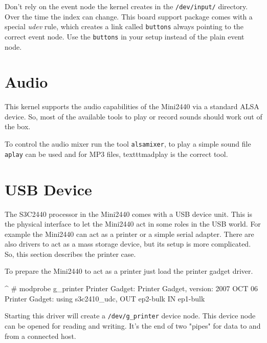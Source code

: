 \begin{important}
Don't rely on the event node the kernel creates in the \texttt{/dev/input/}
directory. Over the time the index can change. This board support package comes
with a special \textit{udev} rule, which creates a link called \texttt{buttons}
always pointing to the correct event node. Use the \texttt{buttons} in your
setup instead of the plain event node.
\end{important}


\section{Audio}						\label{sec:AUDIO}

This kernel supports the audio capabilities of the Mini2440 via a standard
ALSA device. So, most of the available tools to play or record sounds should
work out of the box.

To control the audio mixer run the tool \texttt{alsamixer}, to play a simple
sound file \texttt{aplay} can be used and for MP3 files, texttt{madplay} is the
correct tool.


\section{USB Device}					\label{sec:USBgadget}

The S3C2440 processor in the Mini2440 comes with a USB device unit. This is
the physical interface to let the Mini2440 act in some roles in the USB world.
For example the Mini2440 can act as a printer or a simple serial adapter.
There are also drivers to act as a mass storage device, but its setup is more
complicated. So, this section describes the printer case.

To prepare the Mini2440 to act as a printer just load the printer gadget driver.

\begin{ptxshell}[escapechar=|]{^}
# modprobe g_printer
Printer Gadget: Printer Gadget, version: 2007 OCT 06
Printer Gadget: using s3c2410_udc, OUT ep2-bulk IN ep1-bulk
\end{ptxshell}

Starting this driver will create a \texttt{/dev/g\_printer} device node. This
device node can be opened for reading and writing. It's the end of two
"pipes" for data to and from a connected host.

